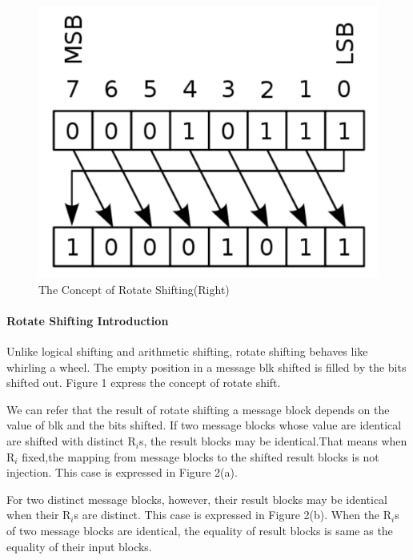 \documentclass{article}
\begin{document}
\begin{figure}[htbp]
 \centering
 \includegraphics[scale=0.4]{./diagrams/rotate_right.pdf}
 \caption{The Concept of Rotate Shifting(Right)}
 \label{fig:1 }
\end{figure}

\paragraph{Rotate Shifting Introduction} 
Unlike logical shifting and arithmetic shifting, rotate shifting
behaves like whirling a wheel. The empty position in a message blk shifted is
filled by the bits shifted out. Figure 1 express the concept of rotate shift.


We can refer that the result of rotate shifting a message block depends on the
value of blk and the bits shifted.  If two message blocks whose value are
identical are shifted with distinct R$_i$s, the result blocks may be
identical.That means when R$_i$ fixed,the mapping from message blocks to the
shifted result blocks is not injection. This case is expressed in Figure 2(a).

For two distinct message blocks, however, their result blocks may be identical
when their R$_i$s are distinct. This case is expressed in Figure 2(b).  
When the R$_i$s of two message blocks are identical, the equality of result blocks
is same as the equality of their input blocks.				
\end{document}
